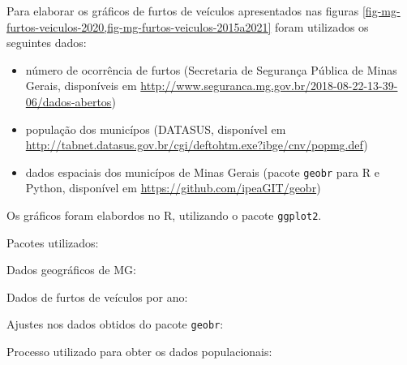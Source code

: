 \begin{frame}
\framebreak

Para elaborar os gráficos de furtos de veículos apresentados nas figuras \ref{fig-mg-furtos-veiculos-2020,fig-mg-furtos-veiculos-2015a2021}
foram utilizados os seguintes dados:
\begin{itemize}
\item número de ocorrência de furtos (Secretaria de Segurança Pública de Minas Gerais, disponíveis em \url{http://www.seguranca.mg.gov.br/2018-08-22-13-39-06/dados-abertos})
\item população dos municípos (DATASUS, disponível em \url{http://tabnet.datasus.gov.br/cgi/deftohtm.exe?ibge/cnv/popmg.def})
\item dados espaciais dos municípos de Minas Gerais (pacote \texttt{geobr} para R e Python, disponível em \url{https://github.com/ipeaGIT/geobr})
\end{itemize}

Os gráficos foram elabordos no R, utilizando o pacote \texttt{ggplot2}.

\framebreak

Pacotes utilizados:


Dados geográficos de MG:


\framebreak
Dados de furtos de veículos por ano:


\framebreak
Ajustes nos dados obtidos do pacote \texttt{geobr}:


\framebreak
Processo utilizado para obter os dados populacionais:




\end{frame}

